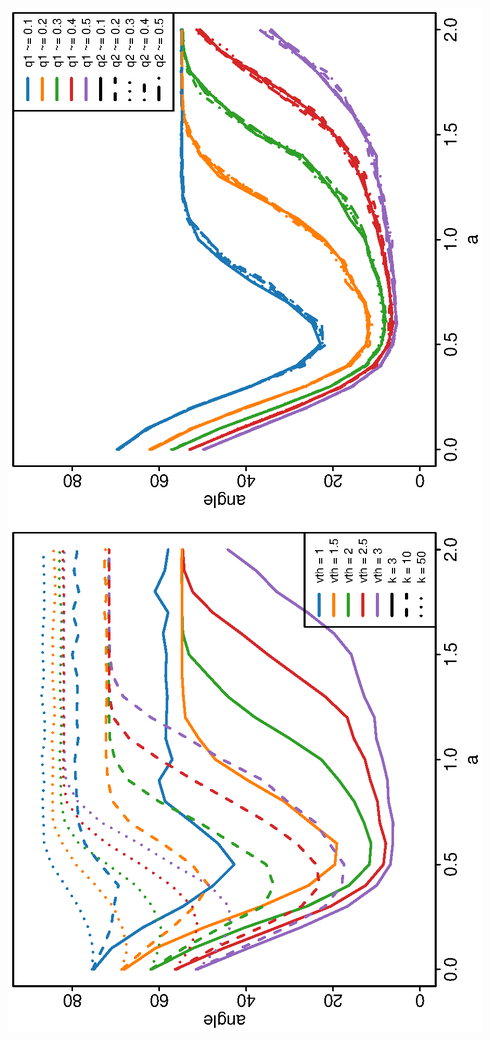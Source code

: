 \documentclass{article}
\begin{document}
\begin{center}
\includegraphics[width=\textwidth]{fig2.eps}
\end{center}
\end{document}
